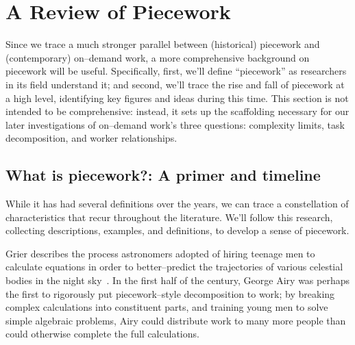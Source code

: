 \documentclass[pn4226]{subfiles}
\begin{document}
\section{A Review of Piecework}

Since we trace a much stronger parallel between
(historical) piecework and (contemporary) on--demand work,
a more comprehensive background on piecework will be useful.
Specifically,
first, we'll define ``piecework'' as researchers in its field understand it;
and second, we'll trace the rise and fall of piecework at a high level,
identifying key figures and ideas during this time.
This section is not intended to be comprehensive:
instead, it sets up the scaffolding necessary for
our later investigations of on--demand work's three questions:
complexity limits,
task decomposition, and
worker relationships.




\subsection{What is piecework?: A primer and timeline}\label{sec:whatIsPiecework}

While it has had several definitions over the years,
we can trace a constellation of characteristics that recur throughout the literature.
We'll follow this research, collecting
descriptions,
examples, and
definitions,
to develop a sense of piecework.

Grier describes the process astronomers adopted of hiring teenage men
to calculate equations in order
to better--predict the trajectories of various celestial bodies in the night sky~\cite{grier2013computers}.
In the first half of the  century, George Airy was perhaps the first to rigorously put piecework--style decomposition to work;
by breaking complex calculations into constituent parts, and
training young men to solve simple algebraic problems,
Airy could distribute work to many more people than could otherwise complete the full calculations.
\end{document}
